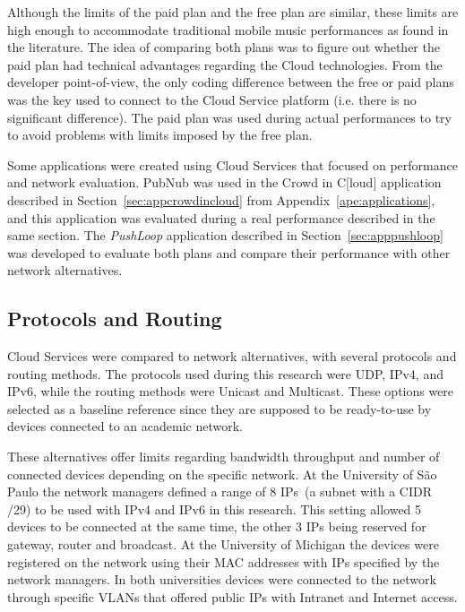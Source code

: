 Although the limits of the paid plan and the free plan are similar, these limits are high enough to accommodate traditional mobile music performances as found in the literature. 
The idea of comparing both plans was to figure out whether the paid plan had technical advantages regarding the Cloud technologies.
From the developer point-of-view, the only coding difference between the free or paid plans was the key used to connect to the Cloud Service platform (i.e. there is no significant difference).
The paid plan was used during actual performances to try to avoid problems with limits imposed by the free plan.

Some applications were created using Cloud Services that focused on performance and network evaluation.
PubNub was used in the Crowd in C[loud] application described in Section~\ref{sec:appcrowdincloud} from Appendix~\ref{ape:applications}, and this application was evaluated during a real performance described in the same section.
The \textit{PushLoop} application described in Section~\ref{sec:apppushloop} was developed to evaluate both plans and compare their performance with other network alternatives.

\subsection*{Protocols and Routing}

Cloud Services were compared to network alternatives, with several protocols and routing methods.
The protocols used during this research were UDP, IPv4, and IPv6, while the routing methods were Unicast and Multicast.
These options were selected as a baseline reference since they are supposed to be ready-to-use by devices connected to an academic network.

These alternatives offer limits regarding bandwidth throughput and number of connected devices depending on the specific network.
At the University of São Paulo the network managers defined a range of 8 IPs~(a subnet with a CIDR /29) to be used with IPv4 and IPv6 in this research.
This setting allowed 5 devices to be connected at the same time, the other 3 IPs being reserved for gateway, router and broadcast.
At the University of Michigan the devices were registered on the network using their MAC addresses with IPs specified by the network managers.
In both universities devices were connected to the network through specific VLANs that offered public IPs with Intranet and Internet access.

